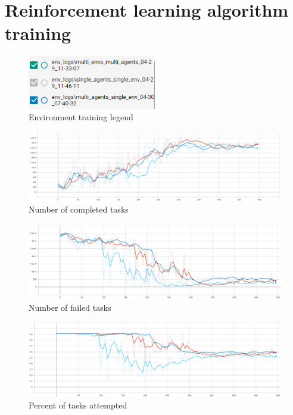 \section{Reinforcement learning algorithm training}\label{sec:reinforcement-learning-algorithm-training}
\begin{figure}
    \includegraphics[width=0.5\textwidth]{figures/env_training_fig/legend.PNG}
    \caption{Environment training legend}
    \label{fig:algo-training-legend}
\end{figure}

\begin{figure}[h]
    \centering
    \includegraphics[width=15cm]{figures/algo_training_fig/num_completed_tasks.PNG}
    \caption{Number of completed tasks}
    \label{fig:algo_num_completed_tasks}
\end{figure}

\begin{figure}[h]
    \centering
    \includegraphics[width=15cm]{figures/algo_training_fig/num_failed_tasks.png}
    \caption{Number of failed tasks}
    \label{fig:algo_num_failed_tasks}
\end{figure}

\begin{figure}[h]
    \centering
    \includegraphics[width=15cm]{figures/algo_training_fig/percent_tasks.png}
    \caption{Percent of tasks attempted}
    \label{fig:algo_percent_tasks}
\end{figure}


